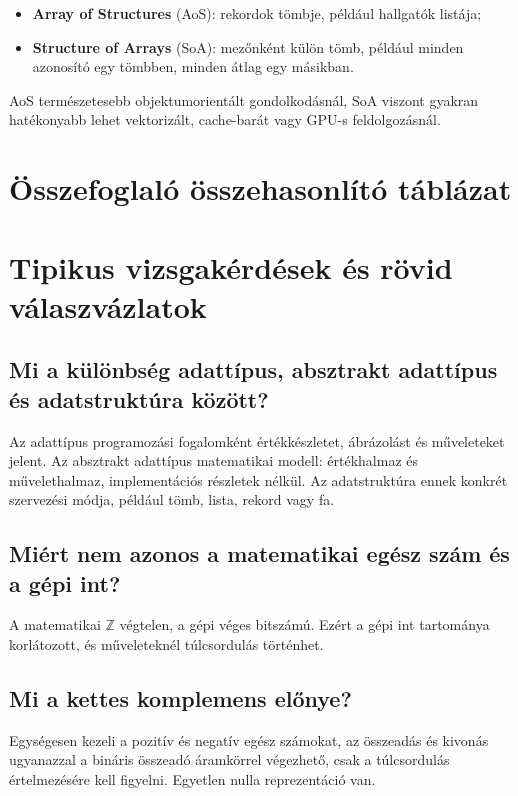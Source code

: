 \begin{itemize}
  \item \textbf{Array of Structures} (AoS): rekordok tömbje, például hallgatók listája;
  \item \textbf{Structure of Arrays} (SoA): mezőnként külön tömb, például minden azonosító egy tömbben, minden átlag egy másikban.
\end{itemize}

AoS természetesebb objektumorientált gondolkodásnál, SoA viszont gyakran hatékonyabb lehet vektorizált, cache-barát vagy GPU-s feldolgozásnál.

\section{Összefoglaló összehasonlító táblázat}



\section{Tipikus vizsgakérdések és rövid válaszvázlatok}

\subsection{Mi a különbség adattípus, absztrakt adattípus és adatstruktúra között?}

Az adattípus programozási fogalomként értékkészletet, ábrázolást és műveleteket jelent. Az absztrakt adattípus matematikai modell: értékhalmaz és művelethalmaz, implementációs részletek nélkül. Az adatstruktúra ennek konkrét szervezési módja, például tömb, lista, rekord vagy fa.

\subsection{Miért nem azonos a matematikai egész szám és a gépi int?}

A matematikai $\mathbb{Z}$ végtelen, a gépi  véges bitszámú. Ezért a gépi int tartománya korlátozott, és műveleteknél túlcsordulás történhet.

\subsection{Mi a kettes komplemens előnye?}

Egységesen kezeli a pozitív és negatív egész számokat, az összeadás és kivonás ugyanazzal a bináris összeadó áramkörrel végezhető, csak a túlcsordulás értelmezésére kell figyelni. Egyetlen nulla reprezentáció van.

